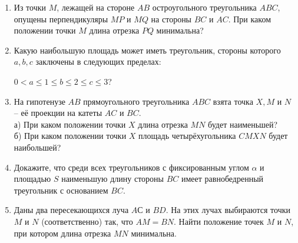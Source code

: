 \documentclass{article}
\begin{document}
\begin{enumerate}[label*=\protect\fbox{\arabic{enumi}}]
\item Из точки $M$, лежащей на стороне $AB$ остроугольного треугольника $ABC$, опущены перпендикуляры $MP$ и $MQ$ на стороны $BC$ и $AC$. При каком положении точки $M$ длина отрезка $PQ$ минимальна? %

\item Какую наибольшую площадь может иметь треугольник, стороны которого $a,b,c$ заключены в следующих пределах:

$0<a\leq 1\leq b\leq 2\leq c\leq 3$?


\item На гипотенузе $AB$ прямоугольного треугольника $ABC$ взята точка $X, M$ и $N$ – её проекции на катеты $AC$ и $BC$.\\
а) При каком положении точки $X$ длина отрезка $MN$ будет наименьшей?\\
б) При каком положении точки $X$ площадь четырёхугольника $CMXN$ будет наибольшей?

\item Докажите, что среди всех треугольников с фиксированным углом $ \alpha$ и площадью $S$ наименьшую длину стороны $BC$ имеет равнобедренный треугольник с основанием $BC$.

\item Даны два пересекающихся луча $AС$ и $BD$. На этих лучах выбираются точки $M$ и $N$ (соответственно) так, что $AM = BN$. Найти положение точек $M$ и $N$, при котором длина отрезка $MN$ минимальна. %

	\end{enumerate} 
\end{document}

